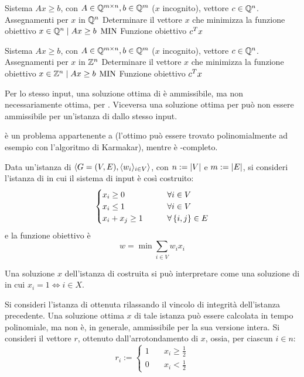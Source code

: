\popt{\LinearProgramming}
{Sistema $Ax\geq b$, con $A\in\mathbb Q^{m\times n},b\in\mathbb Q^m$ ($x$ incognito), vettore $c\in\mathbb Q^n$.}
{Assegnamenti per $x$ in $\mathbb Q^n$}
{Determinare il vettore $x$ che minimizza la funzione obiettivo}
{$x\in\mathbb Q^n\mid Ax\geq b$}
{$\mathrm{MIN}$}
{Funzione obiettivo $c^T x$}

\popt{\IntegerLinearProgramming}
{Sistema $Ax\geq b$, con $A\in\mathbb Q^{m\times n},b\in\mathbb Q^m$ ($x$ incognito), vettore $c\in\mathbb Q^n$.}
{Assegnamenti per $x$ in $\mathbb Z^n$}
{Determinare il vettore $x$ che minimizza la funzione obiettivo}
{$x\in\mathbb Z^n\mid Ax\geq b$}
{$\mathrm{MIN}$}
{Funzione obiettivo $c^T x$}

Per lo stesso input, una soluzione ottima di \IntegerLinearProgramming è ammissibile, ma non necessariamente ottima, per \LinearProgramming.
Viceversa una soluzione ottima per \LinearProgramming può non essere ammissibile per un'istanza di \IntegerLinearProgramming dallo stesso input.

\LinearProgramming è un problema appartenente a \PO (l'ottimo può essere trovato polinomialmente ad esempio con l'algoritmo di Karmakar), mentre \IntegerLinearProgramming è \NPO-completo.

Data un'istanza di \VertexCover $\langle G=(V,E),\langle w_i \rangle_{i\in V} \rangle$, con $n:=| V |$ e $m:=| E |$, si consideri l'istanza di \IntegerLinearProgramming in cui il sistema di input è così costruito:
\begin{equation*}
	\begin{cases}
		x_i\geq 0     & \qquad \forall i\in V         \\
		x_i\leq 1     & \qquad \forall i\in V         \\
		x_i+x_j\geq 1 & \qquad \forall \left\{ i,j \right\}\in E \\
	\end{cases}
\end{equation*}
e la funzione obiettivo è
\begin{equation*}
	w = \min\sum_{i\in V} w_i x_i
\end{equation*}

Una soluzione $x$ dell'istanza di \IntegerLinearProgramming costruita si può interpretare come una soluzione di \VertexCover in cui $x_i=1\iff i\in X$.

Si consideri l'istanza di \LinearProgramming ottenuta rilassando il vincolo di integrità dell'istanza precedente.
Una soluzione ottima $x$ di tale istanza può essere calcolata in tempo polinomiale, ma non è, in generale, ammissibile per la sua versione intera.
Si consideri il vettore $r$, ottenuto dall'arrotondamento di $x$, ossia, per ciascun $i\in n$:
\begin{equation*}
	r_i:= \begin{cases}
		1 & \quad x_i\geq\frac{1}{2} \\
		0 & \quad x_i<\frac{1}{2}
	\end{cases}
\end{equation*}


